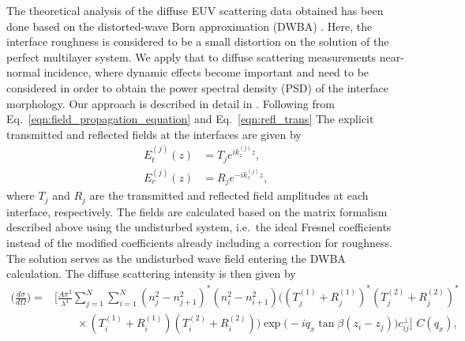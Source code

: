 The theoretical analysis of the diffuse EUV scattering data obtained has been done based on the distorted-wave Born approximation (DWBA) \cite{PhysRevB.49.10668,PhysRevB.47.15896}. Here, the interface roughness is considered to be a small distortion on the solution of the perfect multilayer system. We apply that to diffuse scattering measurements near-normal incidence, where dynamic effects become important and need to be considered in order to obtain the power spectral density (PSD) of the interface morphology. Our approach is described in detail in \cite{haase_role_2014}. Following from Eq.~\eqref{eqn:field_propagation_equation} and Eq.~\eqref{eqn:refl_trans} The explicit transmitted and reflected fields at the interfaces are given by
\begin{align}
        E_t^{(j)}(z) &= T_{j} e^{i k_z^{(j)} z} \text{,} \\
        E_r^{(j)}(z) &= R_{j} e^{-i k_z^{(j)} z} \text{,}
\end{align}
where $T_{j}$ and $R_{j}$ are the transmitted and reflected field amplitudes at each interface, respectively. The fields are calculated based on the matrix formalism described above using the undisturbed system, i.e.~the ideal Fresnel coefficients instead of the modified coefficients already including a correction for roughness. The solution serves as the undisturbed wave field entering the DWBA calculation. The diffuse scattering intensity is then given by
\onecolumn
    \begin{align}
        \Big(\frac{d \sigma}{d \Omega}\Big) = &\Bigg[\frac{A \pi^2}{\lambda^4}\sum \limits_{j=1}^{N}\sum \limits_{i=1}^{N} (n_j^2 - n_{j+1}^2)^* (n_i^2 - n_{i+1}^2)\Big( (T^{(1)}_j + R^{(1)}_j)^* (T^{(2)}_j + R^{(2)}_j)^* \nonumber \\ &\qquad\times(T^{(1)}_i + R^{(1)}_i) (T^{(2)}_i + R^{(2)}_i) \Big) \exp\Big(-i q_x \tan \beta (z_i-z_j)\Big) c^\perp_{i j}\Bigg]\,\, C(q_x) \text{,} \label{eqn:dwba}
    \end{align}

